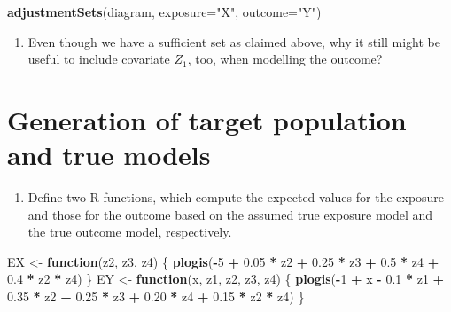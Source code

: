 \documentclass[
]{book}
\newenvironment{Shaded}{\begin{snugshade}}{\end{snugshade}}
\newcommand{\AttributeTok}[1]{\textcolor[rgb]{0.13,0.29,0.53}{#1}}
\newcommand{\ControlFlowTok}[1]{\textcolor[rgb]{0.13,0.29,0.53}{\textbf{#1}}}
\newcommand{\DecValTok}[1]{\textcolor[rgb]{0.00,0.00,0.81}{#1}}
\newcommand{\FloatTok}[1]{\textcolor[rgb]{0.00,0.00,0.81}{#1}}
\newcommand{\FunctionTok}[1]{\textcolor[rgb]{0.13,0.29,0.53}{\textbf{#1}}}
\newcommand{\NormalTok}[1]{#1}
\newcommand{\OtherTok}[1]{\textcolor[rgb]{0.56,0.35,0.01}{#1}}
\newcommand{\SpecialCharTok}[1]{\textcolor[rgb]{0.81,0.36,0.00}{\textbf{#1}}}
\newcommand{\StringTok}[1]{\textcolor[rgb]{0.31,0.60,0.02}{#1}}
\providecommand{\tightlist}{%
  \setlength{\itemsep}{0pt}\setlength{\parskip}{0pt}}
\begin{document}
\begin{Shaded}
\begin{Highlighting}[]
\FunctionTok{adjustmentSets}\NormalTok{(diagram, }\AttributeTok{exposure=}\StringTok{"X"}\NormalTok{, }\AttributeTok{outcome=}\StringTok{"Y"}\NormalTok{)}
\end{Highlighting}
\end{Shaded}

\begin{enumerate}
\def\labelenumi{\arabic{enumi}.}
\setcounter{enumi}{2}
\tightlist
\item
  Even though we have a sufficient set as claimed above, why it still
  might be useful to include covariate \(Z_1\), too, when modelling the
  outcome?
\end{enumerate}

\section{Generation of target population and true models}\label{generation-of-target-population-and-true-models}

\begin{enumerate}
\def\labelenumi{\arabic{enumi}.}
\tightlist
\item
  Define two R-functions, which compute the expected values for the
  exposure and those for the outcome based on the assumed true
  exposure model and the true outcome model, respectively.
\end{enumerate}

\begin{Shaded}
\begin{Highlighting}[]
\NormalTok{EX }\OtherTok{\textless{}{-}} \ControlFlowTok{function}\NormalTok{(z2, z3, z4) \{}
  \FunctionTok{plogis}\NormalTok{(}\SpecialCharTok{{-}}\DecValTok{5} \SpecialCharTok{+} \FloatTok{0.05} \SpecialCharTok{*}\NormalTok{ z2 }\SpecialCharTok{+} \FloatTok{0.25} \SpecialCharTok{*}\NormalTok{ z3 }\SpecialCharTok{+} \FloatTok{0.5} \SpecialCharTok{*}\NormalTok{ z4 }\SpecialCharTok{+} \FloatTok{0.4} \SpecialCharTok{*}\NormalTok{ z2 }\SpecialCharTok{*}\NormalTok{ z4)}
\NormalTok{\}}
\NormalTok{EY }\OtherTok{\textless{}{-}} \ControlFlowTok{function}\NormalTok{(x, z1, z2, z3, z4) \{}
  \FunctionTok{plogis}\NormalTok{(}\SpecialCharTok{{-}}\DecValTok{1} \SpecialCharTok{+}\NormalTok{ x }\SpecialCharTok{{-}} \FloatTok{0.1} \SpecialCharTok{*}\NormalTok{ z1 }\SpecialCharTok{+} \FloatTok{0.35} \SpecialCharTok{*}\NormalTok{ z2 }\SpecialCharTok{+} \FloatTok{0.25} \SpecialCharTok{*}\NormalTok{ z3 }\SpecialCharTok{+}
    \FloatTok{0.20} \SpecialCharTok{*}\NormalTok{ z4 }\SpecialCharTok{+} \FloatTok{0.15} \SpecialCharTok{*}\NormalTok{ z2 }\SpecialCharTok{*}\NormalTok{ z4)}
\NormalTok{\}}
\end{Highlighting}
\end{Shaded}
\end{document}
